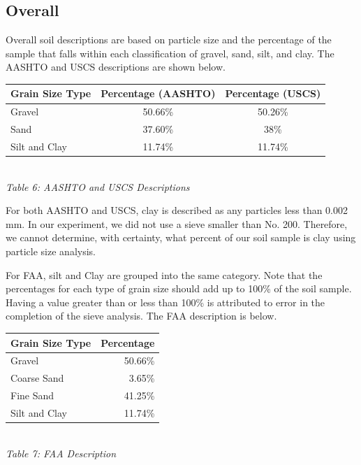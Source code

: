 \documentclass{article}
\begin{document}
\subsection{Overall}
\par Overall soil descriptions are based on particle size and the percentage of the sample that falls within each classification of gravel, sand, silt, and clay. The AASHTO and USCS descriptions are shown below.
\begin{center}
    \begin{tabular}{|l|cc|}
        \hline
        \textbf{Grain Size Type} & \textbf{Percentage (AASHTO)} & \textbf{Percentage (USCS)} \\\hline 
        Gravel & 50.66\% & 50.26\%\\ 
        Sand & 37.60\% & 38\%\\ 
        Silt and Clay & 11.74\% & 11.74\%\\\hline
    \end{tabular}
    \vspace{3mm}
    \emph{\\Table 6: AASHTO  and USCS Descriptions\\}
\end{center}
\par For both AASHTO and USCS, clay is described as any particles less than 0.002 mm. In our experiment, we did not use a sieve smaller than No. 200. Therefore, we cannot determine, with certainty, what percent of our soil sample is clay using particle size analysis. 
\par For FAA, silt and Clay are grouped into the same category. Note that the percentages for each type of grain size should add up to 100\% of the soil sample. Having a value greater than or less than 100\% is attributed to error in the completion of the sieve analysis. The FAA description is below.
\begin{center}
    \begin{tabular}{|l|r|}
        \hline
        \textbf{Grain Size Type} & \textbf{Percentage} \\\hline 
        Gravel & 50.66\% \\
        Coarse Sand & 3.65\% \\
        Fine Sand & 41.25\% \\
        Silt and Clay & 11.74\% \\\hline
    \end{tabular}
    \vspace{3mm}
    \emph{\\Table 7: FAA Description\\}
\end{center}
\newpage
\end{document}
